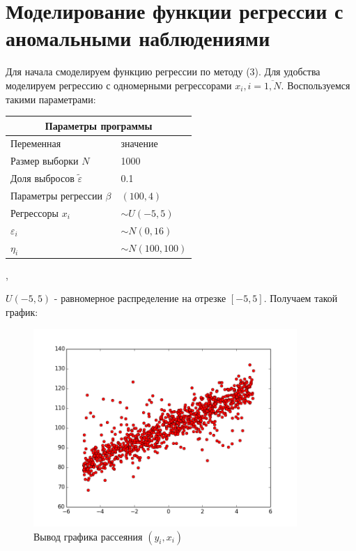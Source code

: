 \documentclass[12pt]{article}
\begin{document}
\section{Моделирование функции регрессии с аномальными наблюдениями}
Для начала смоделируем функцию регрессии по методу (3). Для удобства моделируем регрессию с одномерными регрессорами $x_i, i=\overline{1,N}$.\hfill\break
Воспользуемся такими параметрами:\hfill\break
\begin{center}
\begin{tabular}{|p{5cm}|p{5cm}|}
    \hline
    \multicolumn{2}{|c|}{Параметры программы} \\
    \hline
    Переменная&значение\\
    \hline
    Размер выборки $N$& 1000\\
    \hline
    Доля выбросов $\widetilde{\varepsilon}$& 0.1\\
    \hline
    Параметры регрессии $\beta$& $(100,4)$\\
    \hline
    Регрессоры $x_i$ & $\sim U(-5,5)$\\
    \hline
    $\varepsilon_i$&$\sim N(0,16)$\\
    \hline
    $\eta_i$&$\sim N(100,100)$\\
    \hline
\end{tabular},
\end{center}
$U(-5,5)$ - равномерное распределение на отрезке $[-5,5]$.\hfill\break
Получаем такой график:\hfill\break
\begin{figure}[ht!]
    \centering
    \includegraphics[width=100mm]{graphic.png}
    \caption{Вывод графика рассеяния $(y_i,x_i)$\label{overflow}}
\end{figure}
\newpage
\end{document}
